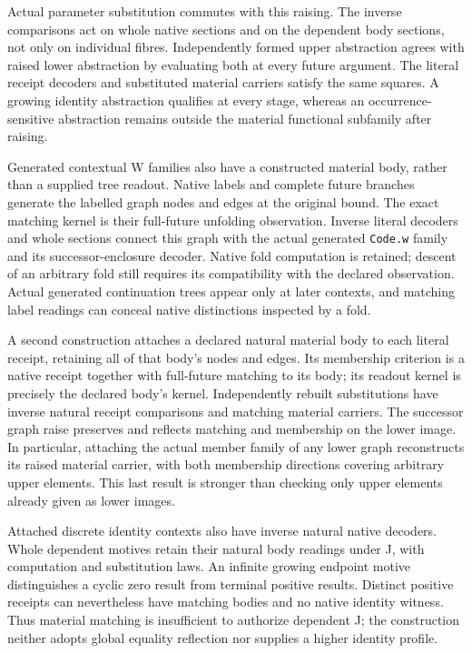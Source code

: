 \documentclass[11pt]{article}
\theoremstyle{definition}
\theoremstyle{remark}
\begin{document}
Actual parameter substitution commutes with this raising.  The inverse
comparisons act on whole native sections and on the dependent body sections,
not only on individual fibres.  Independently formed upper abstraction agrees
with raised lower abstraction by evaluating both at every future argument.
The literal receipt decoders and substituted material carriers satisfy the
same squares.  A growing identity abstraction qualifies at every stage,
whereas an occurrence-sensitive abstraction remains outside the material
functional subfamily after raising.

Generated contextual W families also have a constructed material body, rather
than a supplied tree readout.  Native labels and complete future branches
generate the labelled graph nodes and edges at the original bound.  The exact
matching kernel is their full-future unfolding observation.  Inverse literal
decoders and whole sections connect this graph with the actual generated
\nolinkurl{Code.w} family and its successor-enclosure decoder.  Native fold
computation is retained; descent of an arbitrary fold still requires its
compatibility with the declared observation.  Actual generated continuation
trees appear only at later contexts, and matching label readings can conceal
native distinctions inspected by a fold.

A second construction attaches a declared natural material body to each
literal receipt, retaining all of that body's nodes and edges.  Its membership
criterion is a native receipt together with full-future matching to its body;
its readout kernel is precisely the declared body's kernel.  Independently
rebuilt substitutions have inverse natural receipt comparisons and matching
material carriers.  The successor graph raise preserves and reflects matching
and membership on the lower image.  In particular, attaching the actual member
family of any lower graph reconstructs its raised material carrier, with both
membership directions covering arbitrary upper elements.  This last result is
stronger than checking only upper elements already given as lower images.

Attached discrete identity contexts also have inverse natural native decoders.
Whole dependent motives retain their natural body readings under J, with
computation and substitution laws.  An infinite growing endpoint motive
distinguishes a cyclic zero result from terminal positive results.  Distinct
positive receipts can nevertheless have matching bodies and no native identity
witness.  Thus material matching is insufficient to authorize dependent J;
the construction neither adopts global equality reflection nor supplies a
higher identity profile.
\end{document}
